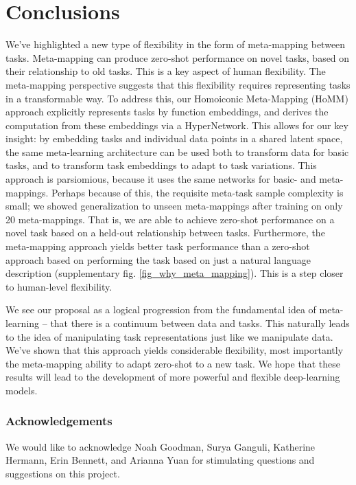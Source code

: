 \documentclass{article}
\begin{document}
\section{Conclusions}
\vspace{-0.5em} %
We've highlighted a new type of flexibility in the form of meta-mapping between tasks. Meta-mapping can produce zero-shot performance on novel tasks, based on their relationship to old tasks. This is a key aspect of human flexibility. The meta-mapping perspective suggests that this flexibility requires representing tasks in a transformable way. To address this, our Homoiconic Meta-Mapping (HoMM) approach explicitly represents tasks by function embeddings, and derives the computation from these embeddings via a HyperNetwork. This allows for our key insight: by embedding tasks and individual data points in a shared latent space, the same meta-learning architecture can be used both to transform data for basic tasks, and to transform task embeddings to adapt to task variations. This approach is parsiomious, because it uses the same networks for basic- and meta-mappings. Perhaps because of this, the requisite meta-task sample complexity is small; we showed generalization to unseen meta-mappings after training on only 20 meta-mappings. That is, we are able to achieve zero-shot performance on a novel task based on a held-out relationship between tasks. Furthermore, the meta-mapping approach yields better task performance than a zero-shot approach based on performing the task based on just a natural language description (supplementary fig. \ref{fig_why_meta_mapping}). This is a step closer to human-level flexibility. \par
We see our proposal as a logical progression from the fundamental idea of meta-learning -- that there is a continuum between data and tasks. This naturally leads to the idea of manipulating task representations just like we manipulate data. We've shown that this approach yields considerable flexibility, most importantly the meta-mapping ability to adapt zero-shot to a new task. We hope that these results will lead to the development of more powerful and flexible deep-learning models. \par
\subsubsection*{Acknowledgements}
We would like to acknowledge Noah Goodman, Surya Ganguli, Katherine Hermann, Erin Bennett, and Arianna Yuan for stimulating questions and suggestions on this project.




\newpage

\end{document}
